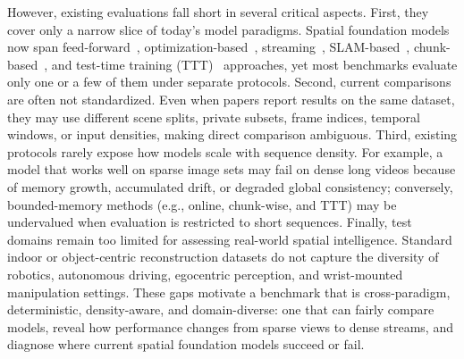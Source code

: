 \documentclass{llmxive}
\begin{document}
However, existing evaluations fall short in several critical aspects. 
%
First, they cover only a narrow slice of today's model paradigms. 
%
Spatial foundation models now span feed-forward~\citep{wang2025vggt,keetha2026mapanything,lin2025depth}, optimization-based~\citep{wang2024dust3r,leroy2024mast3r,zhang2024monst3r}, streaming~\citep{streamVGGT,stream3r2025,chen2026lingbotmap}, SLAM-based~\citep{maggio2025vggt-slam,murai2024_mast3rslam}, chunk-based~\citep{deng2025vggtlong}, and test-time training (TTT)~\citep{chen2025ttt3r,xie2026scal3r,zhang2026loger} approaches, yet most benchmarks evaluate only one or a few of them under separate protocols. 
%
Second, current comparisons are often not standardized. 
%
Even when papers report results on the same dataset, they may use different scene splits, private subsets, frame indices, temporal windows, or input densities, making direct comparison ambiguous. 
%
Third, existing protocols rarely expose how models scale with sequence density. 
%
For example, a model that works well on sparse image sets may fail on dense long videos because of memory growth, accumulated drift, or degraded global consistency; conversely, bounded-memory methods (e.g., online, chunk-wise, and TTT) may be undervalued when evaluation is restricted to short sequences. 
%
Finally, test domains remain too limited for assessing real-world spatial intelligence. 
%
Standard indoor or object-centric reconstruction datasets do not capture the diversity of robotics, autonomous driving, egocentric perception, and wrist-mounted manipulation settings. 
%
These gaps motivate a benchmark that is cross-paradigm, deterministic, density-aware, and domain-diverse: one that can fairly compare models, reveal how performance changes from sparse views to dense streams, and diagnose where current spatial foundation models succeed or fail.
\end{document}
